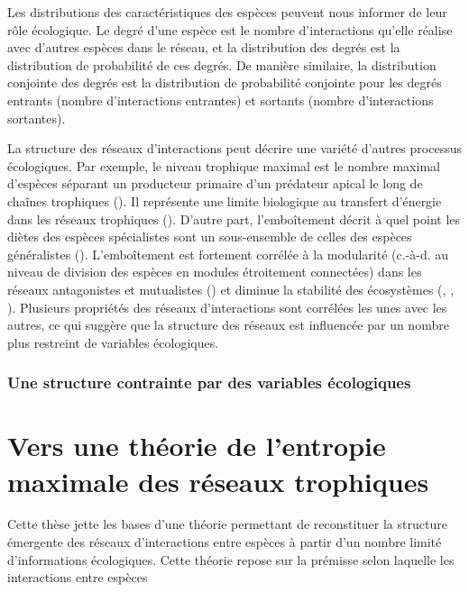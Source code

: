 Les distributions des caractéristiques des espèces peuvent nous informer de 
leur rôle écologique. Le degré d'une espèce est le nombre d'interactions qu'elle réalise avec d'autres
espèces dans le réseau, et la distribution des degrés est la distribution de
probabilité de ces degrés. De manière similaire, la distribution conjointe des
degrés est la distribution de probabilité conjointe pour les degrés entrants
(nombre d'interactions entrantes) et sortants (nombre d'interactions sortantes).

La structure des réseaux d'interactions peut décrire une variété d'autres
processus écologiques. Par exemple, le niveau trophique maximal est le nombre
maximal d'espèces séparant un producteur primaire d'un prédateur apical le long
de chaînes trophiques (\cite{Cohen1978Food}). Il représente une limite
biologique au transfert d'énergie dans les réseaux trophiques
(\cite{Williams2004Limits}). D'autre part, l'emboîtement décrit à quel point les
diètes des espèces spécialistes sont un sous-ensemble de celles des espèces
généralistes (\cite{Staniczenko2013Ghost}). L'emboîtement est fortement corrélée
à la modularité (c.-à-d. au niveau de division des espèces en modules
étroitement connectées) dans les réseaux antagonistes et mutualistes
(\cite{Fortuna2010Nestedness}) et diminue la stabilité des écosystèmes
(\cite{Okuyama2008Network}, \cite{Bastolla2009Architecture},
\cite{Thebault2010Stability}). Plusieurs propriétés des réseaux d'interactions
sont corrélées les unes avec les autres, ce qui suggère que la structure des
réseaux est influencée par un nombre plus restreint de variables écologiques.

\subsubsection{Une structure contrainte par des variables écologiques} 



\section{Vers une théorie de l'entropie maximale des réseaux trophiques}

Cette thèse jette les bases d'une théorie permettant de reconstituer la
structure émergente des réseaux d'interactions entre espèces à partir d'un
nombre limité d'informations écologiques. Cette théorie repose sur la prémisse
selon laquelle les interactions entre espèces 

